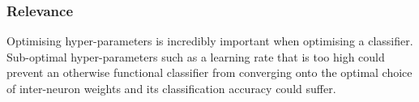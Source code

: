 \subsubsection{Relevance}
Optimising hyper-parameters is incredibly important when optimising a classifier. Sub-optimal hyper-parameters such as a learning rate that is too high could prevent an otherwise functional classifier from converging onto the optimal choice of inter-neuron weights and its classification accuracy could suffer. 

%
%
%

%




